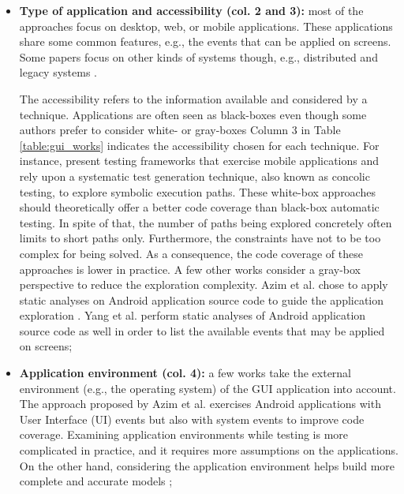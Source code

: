 \begin{itemize}
	\item \textbf{Type of application and accessibility (col.
	2 and 3):} most of the approaches focus on desktop, web, or
	mobile applications. These applications share some common
	features, e.g., the events that can be applied on screens.
	Some papers focus on other kinds of systems though, e.g.,
	distributed and legacy systems \cite{hungar2002}.

	The accessibility refers to the information available and
	considered by a technique. Applications are often seen as
	black-boxes even though some authors prefer to consider
	white- or gray-boxes Column 3 in Table
	\ref{table:gui_works} indicates the accessibility chosen
	for each technique. For instance,
	\cite{concolicandroid12,5416728} present testing frameworks
	that exercise mobile applications and rely upon a
	systematic test generation technique, also known as concolic
	testing, to explore symbolic execution paths. These white-box
	approaches should theoretically offer a better code coverage
    than black-box automatic testing. In spite of that, the
    number of paths being explored concretely often limits to
    short paths only. Furthermore, the constraints have not to be
    too complex for being solved. As a consequence, the code
    coverage of these approaches is lower in practice.
	A few other works consider a gray-box perspective to reduce
	the exploration complexity. Azim et al. chose to apply static
	analyses on Android application source code to guide the
	application exploration \cite{Azim13}. Yang et al.
	\cite{WPX13} perform static analyses of Android application
	source code as well in order to list the available events
	that may be applied on screens;

	\item \textbf{Application environment (col. 4):} a few works
	\cite{Azim13,SP15} take the external environment (e.g., the
	operating system) of the GUI application into account.
	The approach proposed by Azim et al. \cite{Azim13} exercises
	Android applications with User Interface (UI) events but also
	with system events to improve code coverage. Examining
	application environments while testing is more complicated in
	practice, and it requires more assumptions on the
    applications. On the other hand, considering the application
    environment helps build more complete and accurate models
    \cite{SP15};



\end{itemize}
